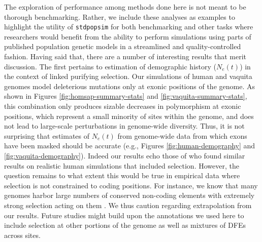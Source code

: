 \documentclass[hidelinks]{article}
\newcommand{\stdpopsim}{\texttt{stdpopsim}\xspace}
\begin{document}
    The exploration of performance among methods done here is not meant to be thorough
    benchmarking.
    Rather, we include these analyses as examples to highlight the utility of \stdpopsim {}
    for both benchmarking and other tasks where researchers would benefit from the ability to perform
    simulations using parts of published population genetic models in a streamlined and quality-controlled fashion.
    Having said that, there are a number of interesting results that merit discussion.
    The first pertains to estimation of demographic history ($N_e(t)$) in the context of
    linked purifying selection. Our simulations of human and vaquita genomes
    model deleterious mutations only at exonic positions of the genome.
    As shown in Figures \ref{fig:homsap-summary-stats} and \ref{fig:vaquita-summary-stats},
    this combination only produces sizable decreases in polymorphism at exonic positions,
    which represent a small minority of sites within the genome, and does not lead to large-scale
    perturbations in genome-wide diversity. Thus, it is not surprising that estimates of $N_e(t)$
    from genome-wide data from which exons have been masked should be accurate
    (e.g., Figures \ref{fig:human-demography} and \ref{fig:vaquita-demography}).
    Indeed our results echo those of \citet{marsh2024biases} who found 
    similar results on realistic human simulations that included selection.
    However, the question remains to what extent this would be true in empirical data where
    selection is not constrained to coding positions. For instance, we know
    that many genomes harbor large numbers
    of conserved non-coding elements \citep[e.g.,][]{siepel2005evolutionarily} with extremely
    strong selection acting on them \citep{katzman2007human,mclean2008dispensability}.
    We thus caution regarding extrapolation from our results. Future studies might build upon
    the annotations we used here to include selection at other portions of the genome as well
    as mixtures of DFEs across sites.
\end{document}
